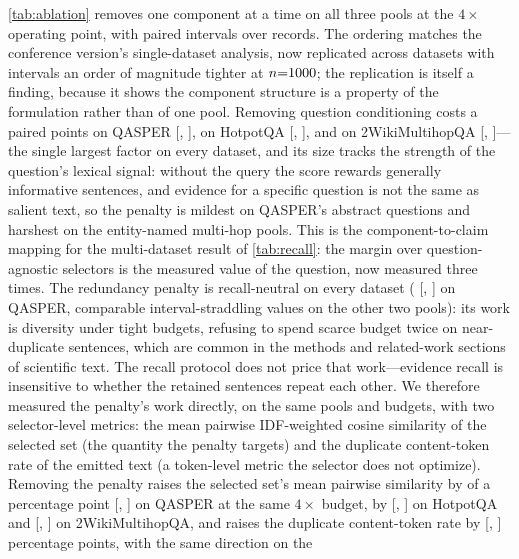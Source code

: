 \documentclass[preprint,12pt]{elsarticle}
\theoremstyle{remark}
\begin{document}
\autoref{tab:ablation} removes one component at a time on all three
pools at the $4\times$ operating point, with paired intervals over
records. The ordering matches the conference version's single-dataset
analysis, now replicated across datasets with intervals an order of
magnitude tighter at $n{=}1000$; the replication is itself a
finding, because it shows the component structure is a property of
the formulation rather than of one pool. Removing question
conditioning costs a paired \AblPairQNoQ{} points on QASPER
[\AblPairQNoQLo, \AblPairQNoQHi], \AblPairHNoQ{} on HotpotQA
[\AblPairHNoQLo, \AblPairHNoQHi], and \AblPairWNoQ{} on
2WikiMultihopQA [\AblPairWNoQLo, \AblPairWNoQHi]---the single
largest factor on every dataset, and its size tracks the strength of
the question's lexical signal: without the query the score rewards
generally informative sentences, and evidence for a specific question
is not the same as salient text, so the penalty is mildest on QASPER's
abstract questions and harshest on the entity-named multi-hop pools.
This is the component-to-claim mapping for the multi-dataset result of
\autoref{tab:recall}: the margin over question-agnostic selectors is
the measured value of the question, now measured three times. The
redundancy penalty is recall-neutral on every dataset (\AblPairQNoRed{}
[\AblPairQNoRedLo, \AblPairQNoRedHi] on QASPER, comparable
interval-straddling values on the other two pools): its work is
diversity under tight budgets, refusing to spend scarce budget twice
on near-duplicate sentences, which are common in the methods and
related-work sections of scientific text. The recall protocol does
not price that work---evidence recall is insensitive to whether the
retained sentences repeat each other.
\ifdefined\RedPairQFourDr
We therefore measured the penalty's work directly, on the same pools
and budgets, with two selector-level metrics: the mean pairwise
IDF-weighted cosine similarity of the selected set (the quantity the
penalty targets) and the duplicate content-token rate of the emitted
text (a token-level metric the selector does not optimize). Removing
the penalty raises the selected set's mean pairwise similarity by
\RedPairQFourSim{} of a percentage point [\RedPairQFourSimLo,
\RedPairQFourSimHi] on QASPER at the same $4\times$ budget, by
\RedPairHFourSim{} [\RedPairHFourSimLo, \RedPairHFourSimHi] on
HotpotQA and \RedPairWFourSim{} [\RedPairWFourSimLo,
\RedPairWFourSimHi] on 2WikiMultihopQA, and raises the duplicate
content-token rate by \RedPairQFourDr{} [\RedPairQFourDrLo,
\RedPairQFourDrHi] percentage points, with the same direction on the
\end{document}
